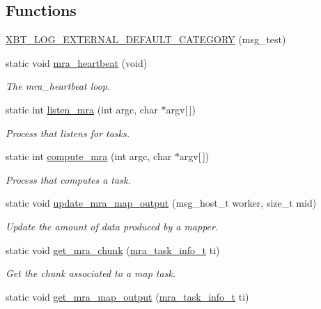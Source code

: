 \subsection*{\-Functions}
\begin{DoxyCompactItemize}
\item 
\hyperlink{worker-mra_8c_a32bd1bae277b9aa336336310547bb693}{\-X\-B\-T\-\_\-\-L\-O\-G\-\_\-\-E\-X\-T\-E\-R\-N\-A\-L\-\_\-\-D\-E\-F\-A\-U\-L\-T\-\_\-\-C\-A\-T\-E\-G\-O\-R\-Y} (msg\-\_\-test)
\item 
static void \hyperlink{worker-mra_8c_a4d9e463f6550447d1fc574ff261b9473}{mra\-\_\-heartbeat} (void)
\begin{DoxyCompactList}\small\item\em \-The mra\-\_\-heartbeat loop. \end{DoxyCompactList}\item 
static int \hyperlink{worker-mra_8c_a2a98086dee3b0dee1f4702f31ecd3edd}{listen\-\_\-mra} (int argc, char $\ast$argv\mbox{[}$\,$\mbox{]})
\begin{DoxyCompactList}\small\item\em \-Process that listens for tasks. \end{DoxyCompactList}\item 
static int \hyperlink{worker-mra_8c_a423d34a846a9eaf36a1a66c67f5f4c5a}{compute\-\_\-mra} (int argc, char $\ast$argv\mbox{[}$\,$\mbox{]})
\begin{DoxyCompactList}\small\item\em \-Process that computes a task. \end{DoxyCompactList}\item 
static void \hyperlink{worker-mra_8c_a7c436b0eb3bc2ed66f582c0532e32681}{update\-\_\-mra\-\_\-map\-\_\-output} (msg\-\_\-host\-\_\-t worker, size\-\_\-t mid)
\begin{DoxyCompactList}\small\item\em \-Update the amount of data produced by a mapper. \end{DoxyCompactList}\item 
static void \hyperlink{worker-mra_8c_a372c22d9788314a0b9ad4e7b887b070d}{get\-\_\-mra\-\_\-chunk} (\hyperlink{common-mra_8h_a54f41524090023e9b283ecbef8b955d6}{mra\-\_\-task\-\_\-info\-\_\-t} ti)
\begin{DoxyCompactList}\small\item\em \-Get the chunk associated to a map task. \end{DoxyCompactList}\item 
static void \hyperlink{worker-mra_8c_acd48736e4d13a0b53b0039fe9c51a5ea}{get\-\_\-mra\-\_\-map\-\_\-output} (\hyperlink{common-mra_8h_a54f41524090023e9b283ecbef8b955d6}{mra\-\_\-task\-\_\-info\-\_\-t} ti)

\end{DoxyCompactItemize}
